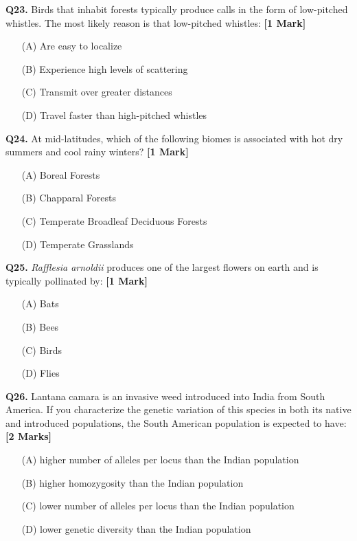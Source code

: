\documentclass[11pt]{article}
\newcommand{\questiona}[2]{
    \noindent\textbf{Q#2.} #1 \hfill \textbf{[1 Mark]}
}
\newcommand{\questionb}[2]{
    \noindent\textbf{Q#2.} #1 \hfill \textbf{[2 Marks]}
}
\begin{document}
\questiona{Birds that inhabit forests typically produce calls in the form of low-pitched whistles. The most likely reason is that low-pitched whistles:}{23}
\begin{enumerate}
    \item[(A)] Are easy to localize  
    \item[(B)] Experience high levels of scattering  
    \item[(C)] Transmit over greater distances  
    \item[(D)] Travel faster than high-pitched whistles  
\end{enumerate}
\vspace{0.5cm}

\questiona{At mid-latitudes, which of the following biomes is associated with hot dry summers and cool rainy winters?}{24}
\begin{enumerate}
    \item[(A)] Boreal Forests  
    \item[(B)] Chapparal Forests  
    \item[(C)] Temperate Broadleaf Deciduous Forests  
    \item[(D)] Temperate Grasslands  
\end{enumerate}
\vspace{0.5cm}

\questiona{\textit{Rafflesia arnoldii} produces one of the largest flowers on earth and is typically pollinated by:}{25}
\begin{enumerate}
    \item[(A)] Bats  
    \item[(B)] Bees  
    \item[(C)] Birds  
    \item[(D)] Flies  
\end{enumerate}
\vspace{0.5cm}

\questionb{Lantana camara is an invasive weed introduced into India from South America. If you characterize the genetic variation of this species in both its native and introduced populations, the South American population is expected to have:}{26}
\begin{enumerate}
    \item[(A)] higher number of alleles per locus than the Indian population  
    \item[(B)] higher homozygosity than the Indian population  
    \item[(C)] lower number of alleles per locus than the Indian population  
    \item[(D)] lower genetic diversity than the Indian population  
\end{enumerate}
\vspace{0.5cm}
\end{document}
